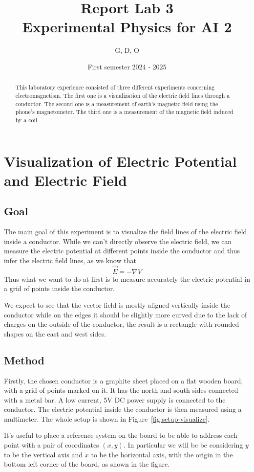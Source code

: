 \documentclass[notitlepage]{report}
\title{Report Lab 3\\\small Experimental Physics for AI 2}
\author{G, D, O}
\date{First semester 2024 \-- 2025}
\numberwithin{equation}{section}
\theoremstyle{plain}
\theoremstyle{definition}
\theoremstyle{remark}
\begin{document}
\maketitle

\begin{abstract}
    This laboratory experience consisted of three different experiments
    concerning electromagnetism. The first one is a visualization of the
    electric field lines through a conductor. The second one is a measurement of
    earth's magnetic field using the phone's magnetometer. The third one is a
    measurement of the magnetic field induced by a coil.
\end{abstract}


\chapter{Visualization of Electric Potential and Electric Field}

\section{Goal}
The main goal of this experiment is to visualize the field lines of the electric
field inside a conductor. While we can't directly observe the electric field, we
can measure the electric potential at different points inside the conductor and
thus infer the electric field lines, as we know that
\[
    \vec{E} = -\nabla V
\]
Thus what we want to do at first is to measure accurately the electric potential
in a grid of points inside the conductor.

We expect to see that the vector field is mostly aligned vertically inside the
conductor while on the edges it should be slightly more curved due to the lack
of charges on the outside of the conductor, the result is a rectangle with
rounded shapes on the east and west sides.
\section{Method}
Firstly, the chosen conductor is a graphite sheet placed on a flat wooden board,
with a grid of points marked on it.
It has the north and south sides connected with a metal bar. A low current, 5V
DC power supply is connected to the conductor. The electric potential inside the
conductor is then measured using a multimeter. The whole setup is shown in
Figure~\ref{fig:setup-visualize}.

It's useful to place a reference system on the board to be able to address each
point with a pair of coordinates \((x, y)\). In particular we will be be
considering \(y\) to be the vertical axis and \(x\) to be the horizontal axis,
with the origin in the bottom left corner of the board, as shown in the figure.
\end{document}
